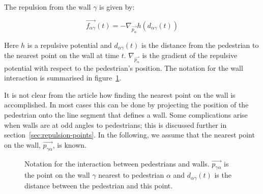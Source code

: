The repulsion from the wall $\gamma$ is given by:

\begin{equation}\label{wallpotential}
    \overrightarrow{f_{\alpha \gamma}}(t) =
    - \nabla_{\overrightarrow{p_{\alpha}}} h
    \left( d_{\alpha \gamma}(t) \right)
\end{equation}

Here $h$ is a repulsive potential and $d_{\alpha \gamma}(t)$ is the distance
from the pedestrian to the nearest point on the wall at time $t$.
$\nabla_{\overrightarrow{p_\alpha}}$ is the gradient of the repulsive
potential with respect to the pedestrian's position. The notation for the wall
interaction is summarised in figure~\ref{fig:wall-notation}.

It is not clear from the article how finding the nearest point on the wall is
accomplished. In most cases this can be done by projecting the position of the
pedestrian onto the line segment that defines a wall. Some complications
arise when walls are at odd angles to pedestrians; this is discussed further
in section~\ref{sec:repulsion-points}. In the following, we assume that the
nearest point on the wall, $\overrightarrow{p_{\gamma \alpha}}$, is known.

\begin{figure}[ht]
    \centering
    \caption[Notation for the interaction between pedestrians and
    walls]{Notation for the interaction between pedestrians and walls.
    $\overrightarrow{p_{\gamma \alpha}}$ is the point on the wall $\gamma$ nearest to pedestrian
    $\alpha$ and  $d_{\alpha \gamma}(t)$ is the distance between the
    pedestrian and this point.}
    \label{fig:wall-notation}
\end{figure}

